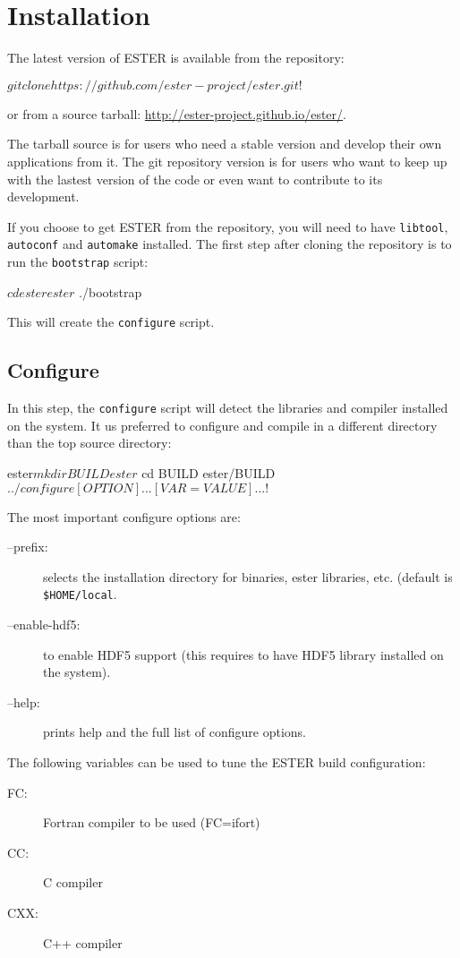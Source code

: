 \pagebreak

\section{Installation}

The latest version of ESTER is available from the \git repository:
\begin{shell}
    $ git clone https://github.com/ester-project/ester.git
    !$
\end{shell}
or from a source tarball: \url{http://ester-project.github.io/ester/}.

The tarball source is for users who need a stable version and develop
their own applications from it. The git repository version is for users
who want to keep up with the lastest version of the code or even want to
contribute to its development.

If you choose to get ESTER from the \git repository, you will need to have
\texttt{libtool}, \texttt{autoconf} and \texttt{automake} installed.
The first step after cloning the repository is to run the \texttt{bootstrap}
script:
\begin{shell}
    $ cd ester
    ester$ ./bootstrap
\end{shell}
This will create the \texttt{configure} script.

\subsection{Configure}
In this step, the \texttt{configure} script will detect the libraries and
compiler installed on the system.
It us preferred to configure and compile in a different directory than the top
source directory:
\begin{shell}
    ester$ mkdir BUILD
    ester$ cd BUILD
    ester/BUILD$ ../configure [OPTION]... [VAR=VALUE]...
    !$
\end{shell}

The most important configure options are:
\begin{description}
    \item[--prefix:] selects the installation directory for binaries,
ester libraries, etc. (default is \texttt{\$HOME/local}.
    \item[--enable-hdf5:] to enable HDF5 support (this requires to have HDF5
        library installed on the system).
    \item[--help:] prints help and the full list of configure options.
\end{description}
The following variables can be used to tune the ESTER build configuration:
\begin{description}
    \item[FC:] Fortran compiler to be used (\eg FC=ifort)
    \item[CC:] C compiler
    \item[CXX:] C++ compiler
\end{description}

